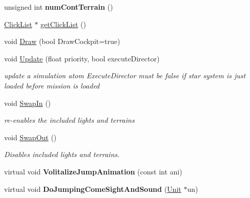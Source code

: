 \begin{DoxyCompactItemize}
\item 
unsigned int {\bfseries num\+Cont\+Terrain} ()\hypertarget{classGameStarSystem_af55fb8610bb0e1576128c9f7b3e039eb}{}\label{classGameStarSystem_af55fb8610bb0e1576128c9f7b3e039eb}

\item 
\hyperlink{classClickList}{Click\+List} $\ast$ \hyperlink{classGameStarSystem_a88b2c8285b7f190a727586025ffddb94}{get\+Click\+List} ()
\item 
void \hyperlink{classGameStarSystem_a22a64a77861767b3503b7c6b5ab0b786}{Draw} (bool Draw\+Cockpit=true)
\item 
void \hyperlink{classGameStarSystem_a1bffb16822504291ff696811dcd574e6}{Update} (float priority, bool execute\+Director)\hypertarget{classGameStarSystem_a1bffb16822504291ff696811dcd574e6}{}\label{classGameStarSystem_a1bffb16822504291ff696811dcd574e6}

\begin{DoxyCompactList}\small\item\em update a simulation atom Execute\+Director must be false if star system is just loaded before mission is loaded \end{DoxyCompactList}\item 
void \hyperlink{classGameStarSystem_a5b934b63e4b95dc0f3e676c0d5e53bf6}{Swap\+In} ()\hypertarget{classGameStarSystem_a5b934b63e4b95dc0f3e676c0d5e53bf6}{}\label{classGameStarSystem_a5b934b63e4b95dc0f3e676c0d5e53bf6}

\begin{DoxyCompactList}\small\item\em re-\/enables the included lights and terrains \end{DoxyCompactList}\item 
void \hyperlink{classGameStarSystem_ab2d3e4ec1e68e3c63d086eabf320f9c6}{Swap\+Out} ()\hypertarget{classGameStarSystem_ab2d3e4ec1e68e3c63d086eabf320f9c6}{}\label{classGameStarSystem_ab2d3e4ec1e68e3c63d086eabf320f9c6}

\begin{DoxyCompactList}\small\item\em Disables included lights and terrains. \end{DoxyCompactList}\item 
virtual void {\bfseries Volitalize\+Jump\+Animation} (const int ani)\hypertarget{classGameStarSystem_aeaecc0c114649348767260637192f1c5}{}\label{classGameStarSystem_aeaecc0c114649348767260637192f1c5}

\item 
virtual void {\bfseries Do\+Jumping\+Come\+Sight\+And\+Sound} (\hyperlink{classUnit}{Unit} $\ast$un)\hypertarget{classGameStarSystem_a79aa06196af9ecbcf5267089bfb09304}{}\label{classGameStarSystem_a79aa06196af9ecbcf5267089bfb09304}


\end{DoxyCompactItemize}
